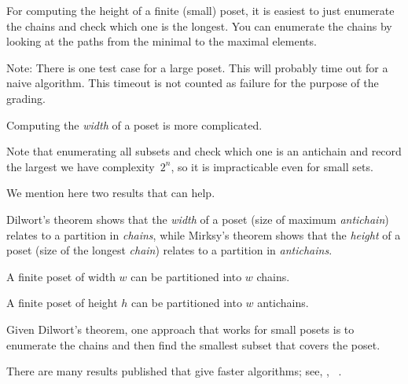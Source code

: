 

\begin{hint}
    For computing the height of a finite (small) poset, it is easiest to just enumerate the chains and check which one is the longest.
    You can enumerate the chains by looking at the paths from the minimal to the maximal elements.
\end{hint}

Note: There is one test case for a large poset.
This will probably time out for a naive algorithm.
This timeout is not counted as failure for the purpose of the grading.

\begin{hint}
    Computing the \emph{width} of a poset is more complicated.

    Note that enumerating all subsets and check which one is an antichain and record the largest we have complexity~$2^n$, so it is impracticable even for small sets.

    We mention here two results that can help.

    Dilwort's theorem shows that the \emph{width} of a poset (size of maximum \emph{antichain}) relates to a partition in \emph{chains}, while Mirksy's theorem shows that the \emph{height} of a poset (size of the longest \emph{chain}) relates to a partition in \emph{antichains}.

    \begin{theorem}
        \label{thm:dilwort}
        A finite poset of width $w$ can be partitioned into $w$ chains.
    \end{theorem}

    \begin{theorem}
        \label{thm:mirsky}
        A finite poset of height $h$ can be partitioned into $w$ antichains.
    \end{theorem}

    Given Dilwort's theorem, one approach that works for small posets is to enumerate the chains and then find the smallest subset that covers the poset.

    There are many results published that give faster algorithms; see, \eg, ~\cite{chen12decomposition}.

\end{hint}

